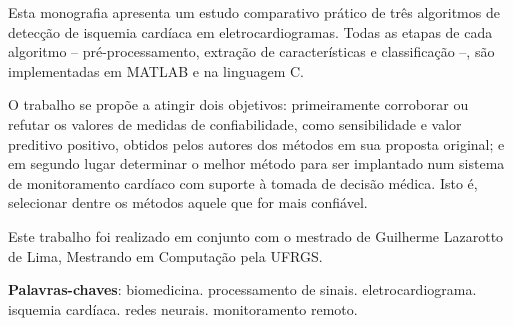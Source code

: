 
\begin{resumo}

\setlength{\parindent}{0.6cm}

Esta monografia apresenta um estudo comparativo prático de três algoritmos de detecção de isquemia cardíaca em eletrocardiogramas. Todas as etapas de cada algoritmo -- pré-processamento, extração de características e classificação --, são implementadas em MATLAB e na linguagem C.

O trabalho se propõe a atingir dois objetivos: primeiramente corroborar ou refutar os valores de medidas de confiabilidade, como sensibilidade e valor preditivo positivo, obtidos pelos autores dos métodos em sua proposta original; e em segundo lugar determinar o melhor método para ser implantado num sistema de monitoramento cardíaco com suporte à tomada de decisão médica. Isto é, selecionar dentre os métodos aquele que for mais confiável.

Este trabalho foi realizado em conjunto com o mestrado de Guilherme Lazarotto de Lima, Mestrando em Computação pela UFRGS.

\null\vfill
\textbf{Palavras-chaves}: biomedicina. processamento de sinais. eletrocardiograma. isquemia cardíaca. redes neurais. monitoramento remoto.

\end{resumo}